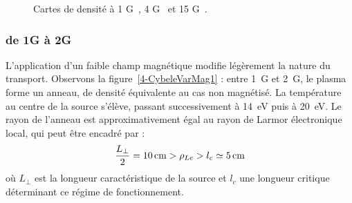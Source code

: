 \begin{refsection}
\begin{figure}[!htb]
  \centering
    \caption{Cartes de densité à 1 G~, 4
    G~ et 15 G~.}
    \label{4-CybeleVarMag-1}
\end{figure}

\subsubsection{de 1G à 2G}

L'application d'un faible champ magnétique modifie légèrement la nature du
transport. Observons la figure~\ref{4-CybeleVarMag1} : entre 1~G et 2~G, le
plasma forme un anneau, de densité équivalente au cas non
magnétisé. La température au centre de la source s'élève, passant 
successivement à 14~eV puis à 20~eV. Le rayon de l'anneau est approximativement
égal au rayon de Larmor électronique local, qui peut être encadré par :
\begin{equation}
\frac{L_\perp}{2}=10\,\text{cm}>\rho{_{Le}}>l_c\simeq 5\,\text{cm}
\end{equation}
où $L_\perp$ est la longueur caractéristique de la source et $l_c$ une longueur
critique déterminant ce régime de fonctionnement. 


\end{refsection}
